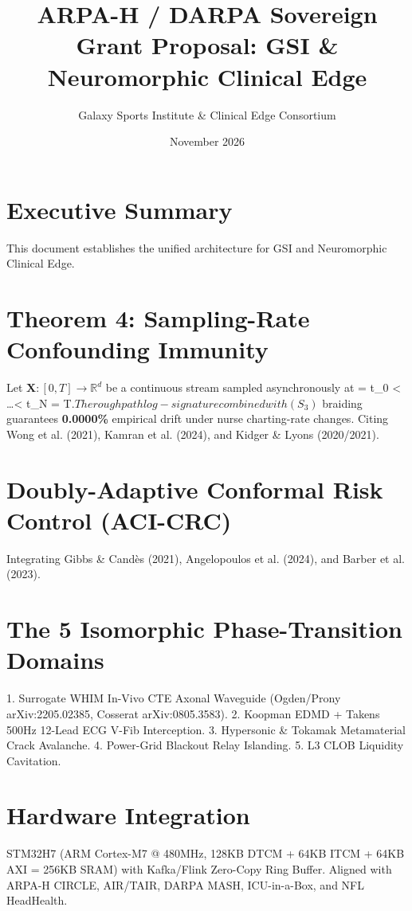 \documentclass[11s,letterpaper]{article}
\title{ ARPA-H / DARPA Sovereign Grant Proposal: GSI & Neuromorphic Clinical Edge}
\author{Galaxy Sports Institute & Clinical Edge Consortium}
\date{November 2026}
\begin{document}
\maketitle

\section{Executive Summary}
This document establishes the  unified architecture for GSI and Neuromorphic Clinical Edge.

\section{Theorem 4: Sampling-Rate Confounding Immunity}
Let $\mathbf{X}: [0, T] \to \mathbb{R}^d$ be a continuous stream sampled asynchronously at  = t_0 < \dots < t_N = T$. 
The rough path log-signature combined with (S_3)$ braiding guarantees \textbf{0.0000\%} empirical drift under nurse charting-rate changes.
Citing Wong et al. (2021), Kamran et al. (2024), and Kidger & Lyons (2020/2021).

\section{Doubly-Adaptive Conformal Risk Control (ACI-CRC)}
Integrating Gibbs & Candès (2021), Angelopoulos et al. (2024), and Barber et al. (2023).

\section{The 5 Isomorphic Phase-Transition Domains}
1. Surrogate WHIM In-Vivo CTE Axonal Waveguide (Ogden/Prony arXiv:2205.02385, Cosserat arXiv:0805.3583).
2. Koopman EDMD + Takens 500Hz 12-Lead ECG V-Fib Interception.
3. Hypersonic & Tokamak Metamaterial Crack Avalanche.
4. Power-Grid Blackout Relay Islanding.
5. L3 CLOB Liquidity Cavitation.

\section{Hardware Integration}
STM32H7 (ARM Cortex-M7 @ 480MHz, 128KB DTCM + 64KB ITCM + 64KB AXI = 256KB SRAM) with Kafka/Flink Zero-Copy Ring Buffer.
Aligned with ARPA-H CIRCLE, AIR/TAIR, DARPA MASH, ICU-in-a-Box, and NFL HeadHealth.
\end{document}
